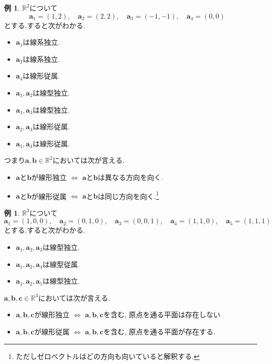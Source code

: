\documentclass[dvipdfmx,a4paper,11pt]{article}
\newcommand{\R}{\mathbb{R}}
\theoremstyle{definition}
\newtheorem{exa}[thm]{例}
\begin{document}
 \begin{exa}
$\R^2$について
$$
\bm{a}_1=(1,2), \quad
\bm{a}_2=(2,2), \quad
\bm{a}_3=(-1,-1), \quad
\bm{a}_4=(0,0) \quad
$$
とする.すると次がわかる.
\begin{itemize}
   \setlength{\parskip}{0cm} 
  \setlength{\itemsep}{0cm}
  \item $\bm{a}_1$は線系独立.
  \item $\bm{a}_2$は線系独立.
  \item $\bm{a}_4$は線形従属.
  \item $\bm{a}_1, \bm{a}_2$は線型独立.
  \item $\bm{a}_1, \bm{a}_3$は線型独立.
    \item $\bm{a}_2, \bm{a}_3$は線形従属.
  \item $\bm{a}_1, \bm{a}_4$は線形従属.
   \end{itemize}
   
 つまり$\bm{a}, \bm{b} \in \R^2$においては次が言える.
\begin{itemize}
   \setlength{\parskip}{0cm} 
  \setlength{\itemsep}{0cm}
 \item $\bm{a}$と$\bm{b}$が線形独立 $  \Leftrightarrow$ $\bm{a}$と$\bm{b}$は異なる方向を向く.
 \item $\bm{a}$と$\bm{b}$が線形従属 $  \Leftrightarrow$ $\bm{a}$と$\bm{b}$は同じ方向を向く.\footnote{ただしゼロベクトルはどの方向も向いていると解釈する.}
 \end{itemize}
\end{exa}


\begin{exa}
$\R^3$について
$$
\bm{a}_1=(1,0,0), \quad
\bm{a}_2=(0,1,0), \quad
\bm{a}_3=(0,0,1), \quad
\bm{a}_4=(1,1,0), \quad
\bm{a}_5=(1,1,1) \quad
$$
とする.すると次がわかる.
\begin{itemize}
   \setlength{\parskip}{0cm} 
  \setlength{\itemsep}{0cm}
  \item $\bm{a}_1, \bm{a}_2, \bm{a}_{3}$は線型独立.
  \item $\bm{a}_1, \bm{a}_2, \bm{a}_{4}$は線型従属.
  \item $\bm{a}_1, \bm{a}_2, \bm{a}_{5}$は線型独立.
   \end{itemize}


 $\bm{a}, \bm{b}, \bm{c} \in \R^3$においては次が言える.
 \begin{itemize}
   \setlength{\parskip}{0cm} 
  \setlength{\itemsep}{0cm}
 \item $\bm{a}, \bm{b}, \bm{c}$が線形独立 $  \Leftrightarrow$ $\bm{a}, \bm{b}, \bm{c}$を含む, 原点を通る平面は存在しない
 \item $\bm{a}, \bm{b}, \bm{c}$が線形従属 $  \Leftrightarrow$ $\bm{a}, \bm{b}, \bm{c}$を含む, 原点を通る平面が存在する. 
 \end{itemize}
 
 \end{exa}
\end{document}
